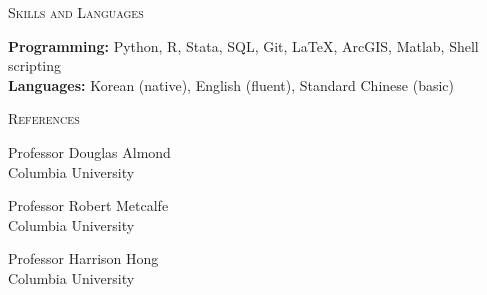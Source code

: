 \documentclass[11pt, letterpaper]{article}
\newcommand{\cvsection}[1]{%
    \par\vspace{9pt}%
    {\Large\scshape #1}\ \hrulefill\par\nopagebreak
    \vspace{3pt}%
}
\begin{document}
\cvsection{Skills and Languages}

\textbf{Programming:} Python, R, Stata, SQL, Git, \LaTeX, ArcGIS, Matlab, Shell scripting\\
\textbf{Languages:} Korean (native), English (fluent), Standard Chinese (basic)


\cvsection{References}

\begin{minipage}[t]{0.32\textwidth}
    Professor Douglas Almond\\
    Columbia University
\end{minipage}\hfill
\begin{minipage}[t]{0.32\textwidth}
    Professor Robert Metcalfe\\
    Columbia University
\end{minipage}\hfill
\begin{minipage}[t]{0.32\textwidth}
    Professor Harrison Hong\\
    Columbia University
\end{minipage}
\end{document}
